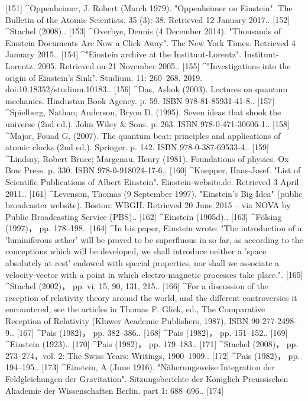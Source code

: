 [151]
^Oppenheimer, J. Robert (March 1979). "Oppenheimer on Einstein". The Bulletin of the Atomic Scientists. 35 (3): 38. Retrieved 12 January 2017..
[152]
^Stachel (2008)..
[153]
^Overbye, Dennis (4 December 2014). "Thousands of Einstein Documents Are Now a Click Away". The New York Times. Retrieved 4 January 2015..
[154]
^"Einstein archive at the Instituut-Lorentz". Instituut-Lorentz. 2005. Retrieved on 21 November 2005..
[155]
^"Investigations into the origin of Einstein's Sink". Studium. 11: 260–268. 2019. doi:10.18352/studium.10183..
[156]
^Das, Ashok (2003). Lectures on quantum mechanics. Hindustan Book Agency. p. 59. ISBN 978-81-85931-41-8..
[157]
^Spielberg, Nathan; Anderson, Bryon D. (1995). Seven ideas that shook the universe (2nd ed.). John Wiley & Sons. p. 263. ISBN 978-0-471-30606-1..
[158]
^Major, Fouad G. (2007). The quantum beat: principles and applications of atomic clocks (2nd ed.). Springer. p. 142. ISBN 978-0-387-69533-4..
[159]
^Lindsay, Robert Bruce; Margenau, Henry (1981). Foundations of physics. Ox Bow Press. p. 330. ISBN 978-0-918024-17-6..
[160]
^Kuepper, Hans-Josef. "List of Scientific Publications of Albert Einstein". Einstein-website.de. Retrieved 3 April 2011..
[161]
^Levenson, Thomas (9 September 1997). "Einstein's Big Idea" (public broadcaster website). Boston: WBGH. Retrieved 20 June 2015 – via NOVA by Public Broadcasting Service (PBS)..
[162]
^Einstein (1905d)..
[163]
^Fölsing (1997)， pp. 178–198..
[164]
^In his paper, Einstein wrote: "The introduction of a 'luminiferous æther' will be proved to be superfluous in so far, as according to the conceptions which will be developed, we shall introduce neither a 'space absolutely at rest' endowed with special properties, nor shall we associate a velocity-vector with a point in which electro-magnetic processes take place.".
[165]
^Stachel (2002)， pp. vi, 15, 90, 131, 215..
[166]
^For a discussion of the reception of relativity theory around the world, and the different controversies it encountered, see the articles in Thomas F. Glick, ed., The Comparative Reception of Relativity (Kluwer Academic Publishers, 1987), ISBN 90-277-2498-9..
[167]
^Pais (1982)， pp. 382–386..
[168]
^Pais (1982)， pp. 151–152..
[169]
^Einstein (1923)..
[170]
^Pais (1982)， pp. 179–183..
[171]
^Stachel (2008)， pp. 273–274，vol. 2: The Swiss Years: Writings, 1900–1909..
[172]
^Pais (1982)， pp. 194–195..
[173]
^Einstein, A (June 1916). "Näherungsweise Integration der Feldgleichungen der Gravitation". Sitzungsberichte der Königlich Preussischen Akademie der Wissenschaften Berlin. part 1: 688–696..
[174]

